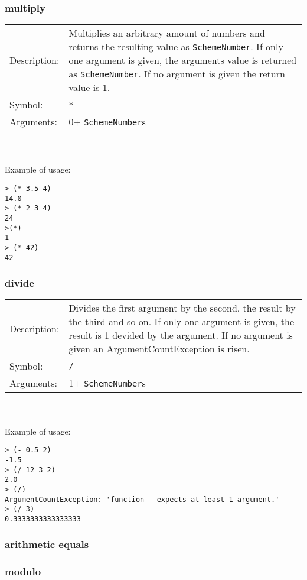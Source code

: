 \documentclass[12pt,a4paper]{scrartcl}
\begin{document}
\subsubsection*{multiply}
\begin{tabular}{l  p{13cm}}
Description: & Multiplies an arbitrary amount of numbers and returns the resulting value as \lstinline{SchemeNumber}. If only one argument is given, the arguments value is returned as \lstinline{SchemeNumber}. If no argument is given the return value is 1.\\
Symbol: & \lstinline{*}\\
Arguments: & 0+ \lstinline{SchemeNumber}s\\
\end{tabular}
\\
\\
Example of usage:
\begin{lstlisting}
> (* 3.5 4)
14.0
> (* 2 3 4)
24
>(*)
1
> (* 42)
42
\end{lstlisting}

\subsubsection*{divide}
\begin{tabular}{l  p{13cm}}
Description: & Divides the first argument by the second, the result by the third and so on. If only one argument is given, the result is 1 devided by the argument. If no argument is given an ArgumentCountException is risen.\\
Symbol: & \lstinline{/}\\
Arguments: & 1+ \lstinline{SchemeNumber}s\\
\end{tabular}
\\
\\
Example of usage:
\begin{lstlisting}
> (- 0.5 2)
-1.5
> (/ 12 3 2)
2.0
> (/)
ArgumentCountException: 'function - expects at least 1 argument.'                                                        
> (/ 3)
0.3333333333333333
\end{lstlisting}
\subsubsection*{arithmetic equals}
\subsubsection*{modulo}
\end{document}
